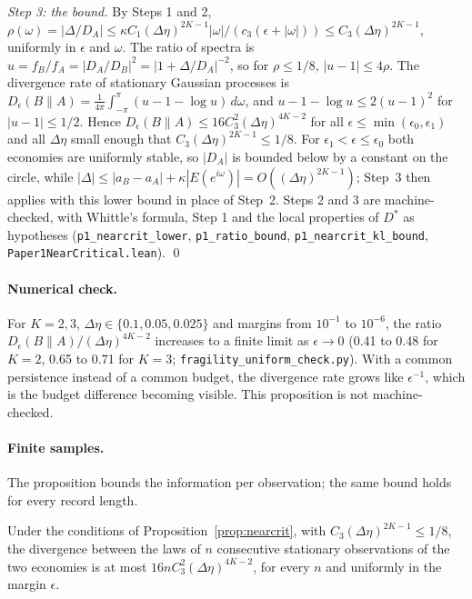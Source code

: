 \emph{Step 3: the bound.} By Steps 1 and 2, $\rho(\omega)=|\Delta/D_A|\le\kappa C_1(\Delta\eta)^{2K-1}|\omega|/(c_3(\epsilon+|\omega|))\le C_3(\Delta\eta)^{2K-1}$, uniformly in $\epsilon$ and $\omega$. The ratio of spectra is $u=f_B/f_A=|D_A/D_B|^2=|1+\Delta/D_A|^{-2}$, so for $\rho\le1/8$, $|u-1|\le4\rho$. The divergence rate of stationary Gaussian processes is $D_\epsilon(B\|A)=\frac1{4\pi}\int_{-\pi}^{\pi}(u-1-\log u)\,d\omega$, and $u-1-\log u\le2(u-1)^2$ for $|u-1|\le1/2$. Hence $D_\epsilon(B\|A)\le16C_3^2(\Delta\eta)^{4K-2}$ for all $\epsilon\le\min(\epsilon_0,\epsilon_1)$ and all $\Delta\eta$ small enough that $C_3(\Delta\eta)^{2K-1}\le1/8$. For $\epsilon_1<\epsilon\le\epsilon_0$ both economies are uniformly stable, so $|D_A|$ is bounded below by a constant on the circle, while $|\Delta|\le|a_B-a_A|+\kappa|E(e^{i\omega})|=O((\Delta\eta)^{2K-1})$; Step~3 then applies with this lower bound in place of Step~2. Steps 2 and 3 are machine-checked, with Whittle's formula, Step 1 and the local properties of $D^*$ as hypotheses (\texttt{p1\_nearcrit\_lower}, \texttt{p1\_ratio\_bound}, \texttt{p1\_nearcrit\_kl\_bound}, \nolinkurl{Paper1NearCritical.lean}). \qed

\paragraph{Numerical check.} For $K=2,3$, $\Delta\eta\in\{0.1,0.05,0.025\}$ and margins from $10^{-1}$ to $10^{-6}$, the ratio $D_\epsilon(B\|A)/(\Delta\eta)^{4K-2}$ increases to a finite limit as $\epsilon\to0$ (0.41 to 0.48 for $K=2$, 0.65 to 0.71 for $K=3$; \nolinkurl{fragility_uniform_check.py}). With a common persistence instead of a common budget, the divergence rate grows like $\epsilon^{-1}$, which is the budget difference becoming visible. This proposition is not machine-checked.


\paragraph{Finite samples.} The proposition bounds the information per observation; the same bound holds for every record length.

\begin{proposition}\label{prop:nearcritn}
Under the conditions of Proposition~\ref{prop:nearcrit}, with $C_3(\Delta\eta)^{2K-1}\le1/8$, the divergence between the laws of $n$ consecutive stationary observations of the two economies is at most $16nC_3^2(\Delta\eta)^{4K-2}$, for every $n$ and uniformly in the margin $\epsilon$.
\end{proposition}

